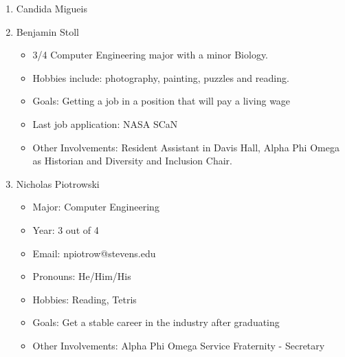 \begin{enumerate}
    \item Candida Migueis
    \item Benjamin Stoll
        \begin{itemize}
            \item 3/4 Computer Engineering major with a minor Biology. 
            \item Hobbies include: photography, painting, puzzles and reading.
            \item Goals: Getting a job in a position that will pay a living wage
            \item Last job application: NASA SCaN
            \item Other Involvements: Resident Assistant in Davis Hall, Alpha Phi Omega as Historian and Diversity and Inclusion Chair.
        \end{itemize}
    \item Nicholas Piotrowski
        \begin{itemize}
        \item Major: Computer Engineering
        \item Year: 3 out of 4
        \item Email: npiotrow@stevens.edu
        \item Pronouns: He/Him/His
        \item Hobbies: Reading, Tetris
        \item Goals: Get a stable career in the industry after graduating
        \item Other Involvements: Alpha Phi Omega Service Fraternity - Secretary
        \end{itemize}
\end{enumerate}
